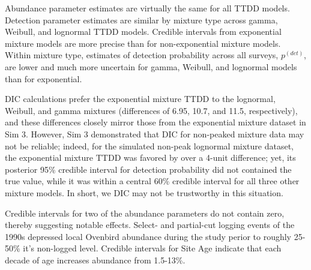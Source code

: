 \documentclass[useAMS,usenatbib,referee,12pt]{article}
\begin{document}
Abundance parameter estimates are virtually the same for all TTDD models.  Detection parameter estimates are similar by mixture type across gamma, Weibull, and lognormal TTDD models.  Credible intervals from exponential mixture models are more precise than for non-exponential mixture models.  Within mixture type, estimates of detection probability across all surveys, $p^{(det)}$, are lower and much more uncertain for gamma, Weibull, and lognormal models than for exponential.

DIC calculations prefer the exponential mixture TTDD to the lognormal, Weibull, and gamma mixtures (differences of 6.95, 10.7, and 11.5, respectively), and these differences closely mirror those from the exponential mixture dataset in Sim 3.  However, Sim 3 demonstrated that DIC for non-peaked mixture data may not be reliable; indeed, for the simulated non-peak lognormal mixture dataset, the exponential mixture TTDD was favored by over a 4-unit difference; yet, its posterior 95\% credible interval for detection probability did not contained the true value, while it was within a central 60\% credible interval for all three other mixture models.  In short, we DIC may not be trustworthy in this situation.

Credible intervals for two of the abundance parameters do not contain zero, thereby suggesting notable effects.  Select- and partial-cut logging events of the 1990s depressed local Ovenbird abundance during the study perior to roughly 25-50\% it's non-logged level.  Credible intervals for Site Age indicate that each decade of age increases abundance from 1.5-13\%.
\end{document}
